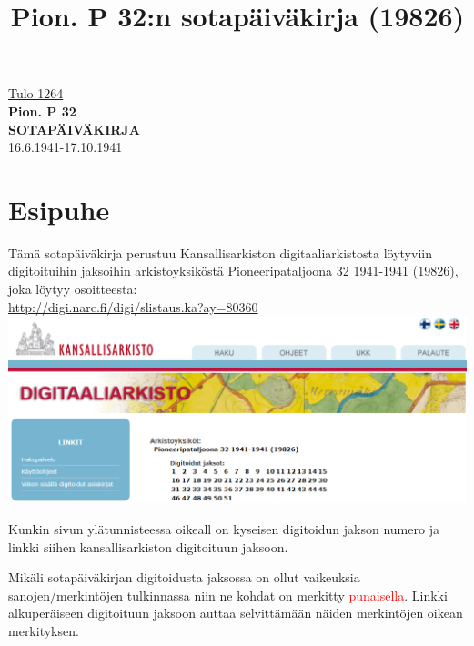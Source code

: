 \documentclass[11pt,a5paper,oneside]{book}
\title{Pion. P 32:n sotapäiväkirja (19826)}
\begin{document}

\extramarks{}{}

\begin{titlepage}
	\begin{center}
		\vspace*{1.5cm}
        \href{http://digi.narc.fi/digi/view.ka?kuid=3753911}{\Large Tulo 1264} \\
       	\vspace{1.5cm}
        \textbf{\Large Pion. P 32} \\
       	\vspace{1.5cm}
		\textbf{\Huge SOTAPÄIVÄKIRJA} \\
		\vspace{1.5cm}
		\Large 16.6.1941-17.10.1941 \\
   	\end{center}
\end{titlepage}

\extramarks{}{}
\section*{Esipuhe}
\setcounter{page}{2}
Tämä sotapäiväkirja perustuu Kansallisarkiston digitaaliarkistosta löytyviin digitoituihin jaksoihin arkistoyksiköstä Pioneeripataljoona 32 1941-1941 (19826), joka löytyy osoitteesta: \\
\url{http://digi.narc.fi/digi/slistaus.ka?ay=80360} \\

\includegraphics[scale=0.45]{jaksot_19826.png}

Kunkin sivun ylätunnisteessa oikeall on kyseisen digitoidun jakson numero ja linkki siihen kansallisarkiston digitoituun jaksoon.

Mikäli sotapäiväkirjan digitoidusta jaksossa on ollut vaikeuksia sanojen/merkintöjen tulkinnassa niin ne kohdat on merkitty \textcolor{red}{punaisella}. Linkki alkuperäiseen digitoituun jaksoon auttaa selvittämään näiden merkintöjen oikean merkityksen.
\end{document}
